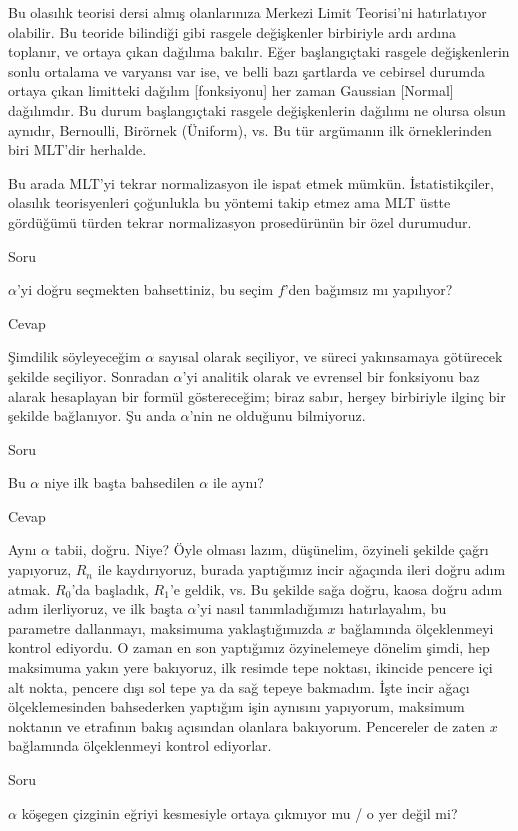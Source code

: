 \documentclass[12pt,fleqn]{article}\usepackage{../../common}
\begin{document}
Bu olasılık teorisi dersi almış olanlarınıza Merkezi Limit Teorisi'ni
hatırlatıyor olabilir. Bu teoride bilindiği gibi rasgele değişkenler birbiriyle
ardı ardına toplanır, ve ortaya çıkan dağılıma bakılır. Eğer başlangıçtaki
rasgele değişkenlerin sonlu ortalama ve varyansı var ise, ve belli bazı
şartlarda ve cebirsel durumda ortaya çıkan limitteki dağılım [fonksiyonu] her
zaman Gaussian [Normal] dağılımdır. Bu durum başlangıçtaki rasgele değişkenlerin
dağılımı ne olursa olsun aynıdır, Bernoulli, Birörnek (Üniform), vs. Bu tür
argümanın ilk örneklerinden biri MLT'dir herhalde.

Bu arada MLT'yi tekrar normalizasyon ile ispat etmek mümkün. İstatistikçiler,
olasılık teorisyenleri çoğunlukla bu yöntemi takip etmez ama MLT üstte gördüğümü
türden tekrar normalizasyon prosedürünün bir özel durumudur.

Soru

$\alpha$'yi doğru seçmekten bahsettiniz, bu seçim $f$'den bağımsız mı yapılıyor?

Cevap

Şimdilik söyleyeceğim $\alpha$ sayısal olarak seçiliyor, ve süreci yakınsamaya
götürecek şekilde seçiliyor. Sonradan $\alpha$'yi analitik olarak ve evrensel
bir fonksiyonu baz alarak hesaplayan bir formül göstereceğim; biraz sabır,
herşey birbiriyle ilginç bir şekilde bağlanıyor. Şu anda $\alpha$'nin ne
olduğunu bilmiyoruz.

Soru

Bu $\alpha$ niye ilk başta bahsedilen $\alpha$ ile aynı?

Cevap

Aynı $\alpha$ tabii, doğru. Niye? Öyle olması lazım, düşünelim, özyineli şekilde
çağrı yapıyoruz, $R_n$ ile kaydırıyoruz, burada yaptığımız incir ağaçında ileri
doğru adım atmak. $R_0$'da başladık, $R_1$'e geldik, vs. Bu şekilde sağa doğru,
kaosa doğru adım adım ilerliyoruz, ve ilk başta $\alpha$'yi nasıl
tanımladığımızı hatırlayalım, bu parametre dallanmayı, maksimuma yaklaştığımızda
$x$ bağlamında ölçeklenmeyi kontrol ediyordu. O zaman en son yaptığımız
özyinelemeye dönelim şimdi, hep maksimuma yakın yere bakıyoruz, ilk resimde tepe
noktası, ikincide pencere içi alt nokta, pencere dışı sol tepe ya da sağ tepeye
bakmadım. İşte incir ağaçı ölçeklemesinden bahsederken yaptığım işin aynısını
yapıyorum, maksimum noktanın ve etrafının bakış açısından olanlara
bakıyorum. Pencereler de zaten $x$ bağlamında ölçeklenmeyi kontrol ediyorlar.

Soru

$\alpha$ köşegen çizginin eğriyi kesmesiyle ortaya çıkmıyor mu / o yer değil mi?
\end{document}
